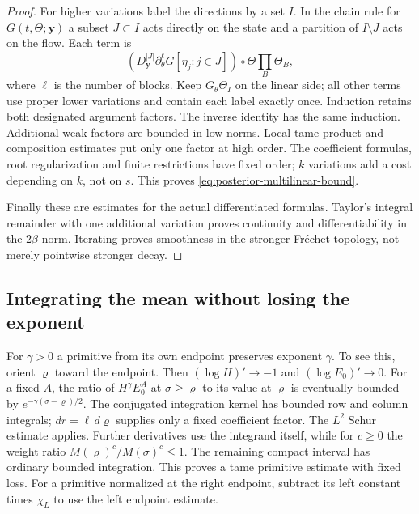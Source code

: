 \begin{proof}
For higher variations label the directions by a set $I$. In the
chain rule for $G(t,\Theta;\mathbf y)$ a subset $J\subset I$ acts
directly on the state and a partition of $I\setminus J$ acts on
the flow. Each term is
\[
 (D_{\mathbf y}^{|J|}\partial_\theta^{\ell}G
                   [\eta_j:j\in J])\circ\Theta
                            \prod_{B}\Theta_B,
\]
where $\ell$ is the number of blocks. Keep $G_\theta\Theta_I$
on the linear side; all other terms use proper lower variations and
contain each label exactly once. Induction retains both designated
argument factors. The inverse identity has the same induction.
Additional weak factors are bounded in low norms. Local tame product
and composition estimates put only one factor at high order. The
coefficient formulas, root regularization and finite restrictions
have fixed order; $k$ variations add a cost depending on $k$, not
on $s$. This proves \eqref{eq:posterior-multilinear-bound}.

Finally these are estimates for the actual differentiated formulas.
Taylor's integral remainder with one additional variation proves
continuity and differentiability in the $2\beta$ norm. Iterating
proves smoothness in the stronger Fr\'echet topology, not merely
pointwise stronger decay.
\end{proof}

\subsection{Integrating the mean without losing the exponent}

For $\gamma>0$ a primitive from its own endpoint preserves exponent
$\gamma$. To see this, orient $\varrho$ toward the endpoint. Then
$(\log H)'\to-1$ and $(\log E_0)'\to0$. For a fixed $A$,
the ratio of $H^\gamma E_0^A$ at $\sigma\ge\varrho$ to its value at
$\varrho$ is eventually bounded by
$e^{-\gamma(\sigma-\varrho)/2}$. The conjugated integration kernel
has bounded row and column integrals; $dr=\ell\,d\varrho$ supplies
only a fixed coefficient factor. The $L^2$ Schur estimate applies.
Further derivatives use the integrand itself, while for $c\ge0$
the weight ratio $M(\varrho)^c/M(\sigma)^c\le1$.
The remaining compact interval has ordinary bounded integration.
This proves a tame primitive estimate with fixed loss. For a
primitive normalized at the right endpoint, subtract its left
constant times $\chi_L$ to use the left endpoint estimate.

